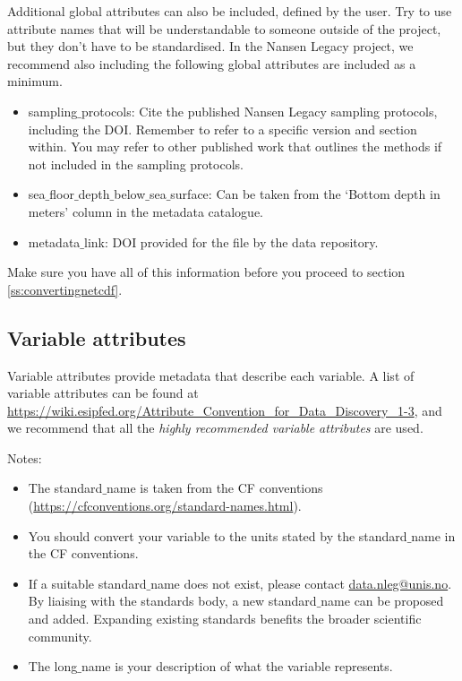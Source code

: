 \documentclass[a4paper,english, 11pt]{article}
\makeatletter
\newcommand{\emailme}{\href{mailto:data.nleg@unis.no}{data.nleg@unis.no}}
\makeatother
\begin{document}
Additional global attributes can also be included, defined by the user. Try to use attribute names that will be understandable to someone outside of the project, but they don't have to be standardised. In the Nansen Legacy project, we recommend also including the following global attributes are included as a minimum. 

\begin{itemize}
\item {sampling$\_$protocols}: Cite the published Nansen Legacy sampling protocols, including the DOI. Remember to refer to a specific version and section within. You may refer to other published work that outlines the methods if not included in the sampling protocols.
\item {sea$\_$floor$\_$depth$\_$below$\_$sea$\_$surface}: Can be taken from the `Bottom depth in meters' column in the metadata catalogue.
\item {metadata$\_$link}: DOI provided for the file by the data repository.
\end{itemize}   

Make sure you have all of this information before you proceed to section \ref{ss:convertingnetcdf}.

\subsection{Variable attributes}
\label{ss:variableattributes}

Variable attributes provide metadata that describe each variable. A list of variable attributes can be found at \url{https://wiki.esipfed.org/Attribute_Convention_for_Data_Discovery_1-3}, and we recommend that all the \textit{highly recommended variable attributes} are used.

Notes:
\begin{itemize}
\item The standard$\_$name is taken from the CF conventions (\url{https://cfconventions.org/standard-names.html}). 
\item You should convert your variable to the units stated by the standard$\_$name in the CF conventions.
\item If a suitable standard$\_$name does not exist, please contact \emailme . By liaising with the standards body, a new standard$\_$name can be proposed and added. Expanding existing standards benefits the broader scientific community.
\item The long$\_$name is your description of what the variable represents.  
\end{itemize}
\end{document}
